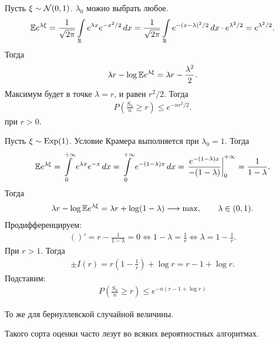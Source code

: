\documentclass[../main.tex]{subfiles}
\begin{document}
\begin{exmpl}
 Пусть $ \xi \sim \mathcal N(0, 1) $. $ \lambda_0 $ можно выбрать любое.
  \begin{align*}
  \mathbb E e^{\lambda \xi} = \frac{1}{\sqrt{2\pi}} \int\limits_{\mathbb{R}} e^{\lambda x}  e^{-x^{2} / 2}\,dx = \frac{1}{\sqrt{2\pi}} \int\limits_{\mathbb{R}} e^{-(x-\lambda)^{2} / 2}\,dx \cdot e^{\lambda^{2} / 2} = e^{\lambda^{2} / 2}.
 \end{align*} Тогда
 \begin{align*}
  \lambda r - \log \mathbb E e^{\lambda \xi}  = \lambda r - \frac{\lambda^{2}}{2}.
 \end{align*} Максимум будет в точке $ \lambda = r $, и равен  $ r^{2}  / 2$. Тогда
 \begin{align*}
  P \left( \frac{S_n}{n} \geqslant r \right) \leqslant e^{-nr^{2} / 2}.
 \end{align*} при $ r > 0 $.
\end{exmpl}
\begin{exmpl}
 Пусть $ \xi \sim \mathrm{Exp}(1) $. Условие Крамера выполняется при  $ \lambda_0 = 1 $. Тогда
  \begin{align*}
  \mathbb E e^{\lambda \xi} = \int\limits_{0}^{+\infty} e^{\lambda x}e^{-x}\,dx = \int\limits_{0}^{+\infty} e^{-(1 - \lambda)x}\,dx = \left. \frac{e^{-(1-\lambda)x}}{-(1-\lambda)} \right|_0^{+\infty} = \frac{1}{1 - \lambda}.
 \end{align*} Тогда
 \begin{align*}
  \lambda r - \log \mathbb E e^{\lambda \xi} = \lambda r + \log (1 - \lambda) \longrightarrow \max, \qquad \lambda \in (0, 1).
 \end{align*} Продифференцируем:
 \begin{align*}
  ()' = r - \frac{1}{1 - \lambda} = 0 \iff 1 - \lambda = \frac{1}{r} \iff \lambda = 1 - \frac{1}{r}.
 \end{align*} При $ r > 1 $. Тогда
  \begin{align*}
  \pm I(r) = r\left(1 - \frac{1}{r}\right) + \log r = r - 1 + \log r.
 \end{align*} Подставим:
 \begin{align*}
  P \left( \frac{S_n}{n} \geqslant r \right) \leqslant e^{-n(r - 1 + \log r)}
 \end{align*}
\end{exmpl}

\begin{exercs*}
 То же для бернуллевской случайной величины.
\end{exercs*}

Такого сорта оценки часто лезут во всяких вероятностных алгоритмах.
\end{document}
